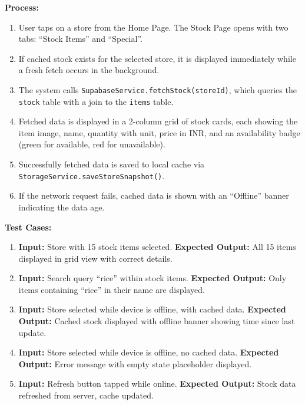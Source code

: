 \textbf{Process:}
\begin{enumerate}
    \item User taps on a store from the Home Page. The Stock Page opens with two tabs: ``Stock Items'' and ``Special''.
    \item If cached stock exists for the selected store, it is displayed immediately while a fresh fetch occurs in the background.
    \item The system calls \texttt{SupabaseService.fetchStock(storeId)}, which queries the \texttt{stock} table with a join to the \texttt{items} table.
    \item Fetched data is displayed in a 2-column grid of stock cards, each showing the item image, name, quantity with unit, price in INR, and an availability badge (green for available, red for unavailable).
    \item Successfully fetched data is saved to local cache via \newline \texttt{StorageService.saveStoreSnapshot()}.
    \item If the network request fails, cached data is shown with an ``Offline'' banner indicating the data age.
\end{enumerate}

\textbf{Test Cases:}
\begin{enumerate}
    \item \textbf{Input:} Store with 15 stock items selected. \textbf{Expected Output:} All 15 items displayed in grid view with correct details.

    \item \textbf{Input:} Search query ``rice'' within stock items. \textbf{Expected Output:} Only items containing ``rice'' in their name are displayed.

    \item \textbf{Input:} Store selected while device is offline, with cached data. \textbf{Expected Output:} Cached stock displayed with offline banner showing time since last update.

    \item \textbf{Input:} Store selected while device is offline, no cached data. \textbf{Expected Output:} Error message with empty state placeholder displayed.

    \item \textbf{Input:} Refresh button tapped while online. \textbf{Expected Output:} Stock data refreshed from server, cache updated.
\end{enumerate}

